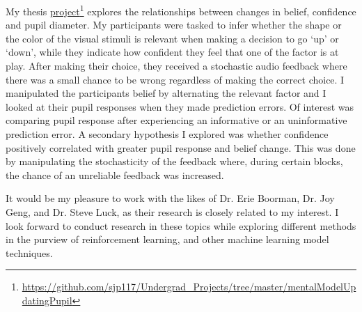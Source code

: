 \documentclass[12pt]{article}
\begin{document}
	My thesis \href{https://github.com/sjp117/Undergrad_Projects/tree/master/mentalModelUpdatingPupil}{project}\footnote{\url{https://github.com/sjp117/Undergrad\_Projects/tree/master/mentalModelUpdatingPupil}} explores the relationships between changes in belief, confidence and pupil diameter. My participants were tasked to infer whether the shape or the color of the visual stimuli is relevant when making a decision to go `up' or `down', while they indicate how confident they feel that one of the factor is at play. After making their choice, they received a stochastic audio feedback where there was a small chance to be wrong regardless of making the correct choice. I manipulated the participants belief by alternating the relevant factor and I looked at their pupil responses when they made prediction errors. Of interest was comparing pupil response after experiencing an informative or an uninformative prediction error. A secondary hypothesis I explored was whether confidence positively correlated with greater pupil response and belief change. This was done by manipulating the stochasticity of the feedback where, during certain blocks, the chance of an unreliable feedback was increased.

	It would be my pleasure to work with the likes of Dr. Erie Boorman, Dr. Joy Geng, and Dr. Steve Luck, as their research is closely related to my interest. I look forward to conduct research in these topics while exploring different methods in the purview of reinforcement learning, and other machine learning model techniques.
	
\end{document}
